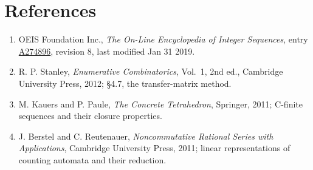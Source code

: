 \documentclass[11pt]{article}
\theoremstyle{definition}
\begin{document}
\section{References}

\begin{enumerate}

\item OEIS Foundation Inc., \emph{The On-Line Encyclopedia of Integer Sequences}, entry \href{https://oeis.org/A274896}{A274896}, revision 8, last modified Jan 31 2019.

\item R. P. Stanley, \emph{Enumerative Combinatorics}, Vol.~1, 2nd ed., Cambridge University Press, 2012; \S4.7, the transfer-matrix method.

\item M. Kauers and P. Paule, \emph{The Concrete Tetrahedron}, Springer, 2011; C-finite sequences and their closure properties.

\item J. Berstel and C. Reutenauer, \emph{Noncommutative Rational Series with Applications}, Cambridge University Press, 2011; linear representations of counting automata and their reduction.

\end{enumerate}
\end{document}
